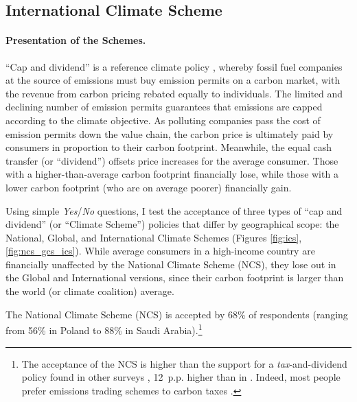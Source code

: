 \documentclass[12pt,english]{article}
\begin{document}
\begin{bibunit}
\subsection{International Climate Scheme}\label{subsec:ics}

\paragraph{Presentation of the Schemes.} ``Cap and dividend'' is a reference climate policy  \citep{grubb_greenhouse_1990,bertram_tradeable_1992,baer_equity_2000,barnes_creating_2008,blanchard_major_2021},
whereby fossil fuel companies at the source of emissions must buy emission permits on a carbon market, with the revenue from carbon pricing rebated equally to individuals. The limited and declining number of emission permits guarantees that emissions are capped according to the climate objective. As polluting companies pass the cost of emission permits down the value chain, the carbon price is ultimately paid by consumers in proportion to their carbon footprint. Meanwhile, the equal cash transfer (or ``dividend'') offsets price increases for the average consumer. Those with a higher-than-average carbon footprint financially lose, while those with a lower carbon footprint (who are on average poorer) financially gain.

Using simple \textit{Yes}/\textit{No} questions, I test the acceptance of three types of ``cap and dividend'' (or ``Climate Scheme'') policies that differ by geographical scope: the National, Global, and International Climate Schemes (Figures \ref{fig:ics}, \ref{fig:ncs_gcs_ics}). While average consumers in a high-income country are financially unaffected by the National Climate Scheme (NCS), they lose out in the Global and International versions, since their carbon footprint is larger than the world (or climate coalition) average.

The National Climate Scheme (NCS)
is accepted by 68\% of respondents (ranging from 56\% in Poland to 88\% in Saudi Arabia).\footnote{The acceptance of the NCS is higher than the support for a \textit{tax}-and-dividend policy found in other surveys \citep{douenne_yellow_2022,mildenberger_limited_2022}, 12~p.p. higher than in \cite{dechezlepretre_fighting_2025}. Indeed, most people prefer emissions trading schemes to carbon taxes \citep{funke_prices_2025}.}


\end{bibunit}
\end{document}
